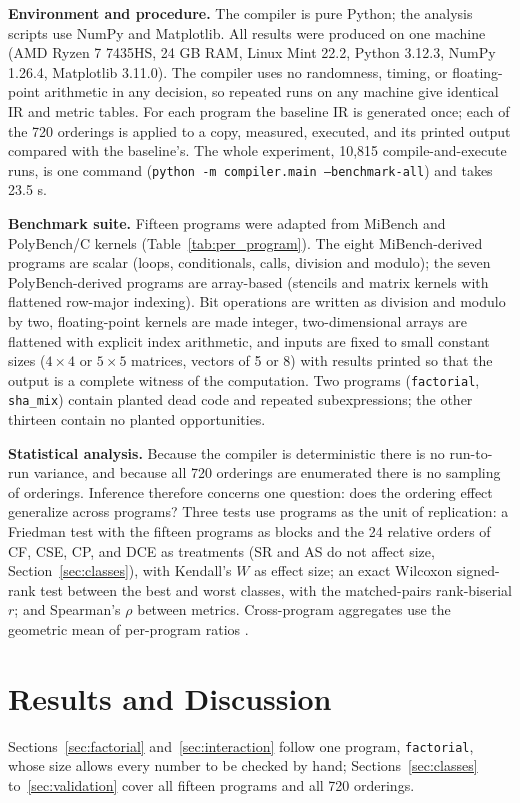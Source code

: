\documentclass[conference]{IEEEtran}
\begin{document}
\textbf{Environment and procedure.} The compiler is pure Python; the analysis scripts use NumPy and Matplotlib. All results were produced on one machine (AMD Ryzen 7 7435HS, 24 GB RAM, Linux Mint 22.2, Python 3.12.3, NumPy 1.26.4, Matplotlib 3.11.0). The compiler uses no randomness, timing, or floating-point arithmetic in any decision, so repeated runs on any machine give identical IR and metric tables. For each program the baseline IR is generated once; each of the 720 orderings is applied to a copy, measured, executed, and its printed output compared with the baseline's. The whole experiment, 10,815 compile-and-execute runs, is one command (\texttt{python -m compiler.main --benchmark-all}) and takes 23.5 s.

\textbf{Benchmark suite.} Fifteen programs were adapted from MiBench \cite{ref32} and PolyBench/C \cite{ref31} kernels (Table~\ref{tab:per_program}). The eight MiBench-derived programs are scalar (loops, conditionals, calls, division and modulo); the seven PolyBench-derived programs are array-based (stencils and matrix kernels with flattened row-major indexing). Bit operations are written as division and modulo by two, floating-point kernels are made integer, two-dimensional arrays are flattened with explicit index arithmetic, and inputs are fixed to small constant sizes ($4\times4$ or $5\times5$ matrices, vectors of 5 or 8) with results printed so that the output is a complete witness of the computation. Two programs (\texttt{factorial}, \texttt{sha\_mix}) contain planted dead code and repeated subexpressions; the other thirteen contain no planted opportunities.

\textbf{Statistical analysis.} Because the compiler is deterministic there is no run-to-run variance, and because all 720 orderings are enumerated there is no sampling of orderings. Inference therefore concerns one question: does the ordering effect generalize across programs? Three tests use programs as the unit of replication: a Friedman test with the fifteen programs as blocks and the 24 relative orders of CF, CSE, CP, and DCE as treatments (SR and AS do not affect size, Section~\ref{sec:classes}), with Kendall's $W$ as effect size; an exact Wilcoxon signed-rank test between the best and worst classes, with the matched-pairs rank-biserial $r$; and Spearman's $\rho$ between metrics. Cross-program aggregates use the geometric mean of per-program ratios \cite{ref33}.

\section{Results and Discussion}
Sections~\ref{sec:factorial} and~\ref{sec:interaction} follow one program, \texttt{factorial}, whose size allows every number to be checked by hand; Sections~\ref{sec:classes} to~\ref{sec:validation} cover all fifteen programs and all 720 orderings.
\end{document}

